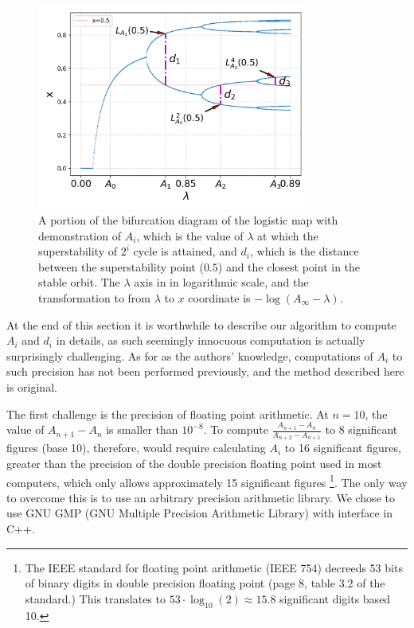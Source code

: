 \begin{figure}
	\centering
	\includegraphics[width=0.8\textwidth]{./figures/demonstration of feigenbaum constants.png}
	\caption{ 
		A portion of the bifurcation diagram of the logistic map with demonstration of  $A_i$, which is the value of $\lambda$ at which the superstability of $2^i$ cycle is attained, and $d_i$, which is the distance between the superstability point ($0.5$) and the closest point in the stable orbit.
		The $\lambda$ axis in in logarithmic scale, and the transformation to from $\lambda$ to $x$ coordinate is $-\log(A_{\infty} - \lambda)$.
	}
	\label{fig:demonstration of feigenbaum constants on logistic map}
\end{figure}

At the end of this section it is worthwhile to describe our algorithm to compute $A_i$ and $d_i$ in details, as such seemingly innocuous computation is actually surprisingly challenging.
As for as the authors' knowledge, computations of $A_i$ to such precision has not been performed previously, and the method described here is original.

The first challenge is the precision of floating point arithmetic.
At $n = 10$, the value of $A_{n+1} -A_{n} $ is smaller than $ 10^{-8}$. 
To compute $\frac{A_{n+1} - A_n}{A_{n+2} - A_{n+1}}$ to $8$ significant figures (base 10), therefore, would require calculating $A_i$ to 16 significant figures, greater than the precision of the double precision floating point used in most computers, which only allows approximately 15 significant figures
\footnote{
	The IEEE standard for floating point arithmetic \cite{IEEE_floating_point} (IEEE 754) decreeds 53 bits of binary digits in double precision floating point (page 8, table 3.2 of the standard.) This translates to $53 \cdot \log_{10}(2) \approx 15.8$ significant digits based 10.
}.
The only way to overcome this is to use an arbitrary precision arithmetic library. 
We chose to use GNU GMP (GNU Multiple Precision Arithmetic Library) \cite{GMP} with interface in C++.


